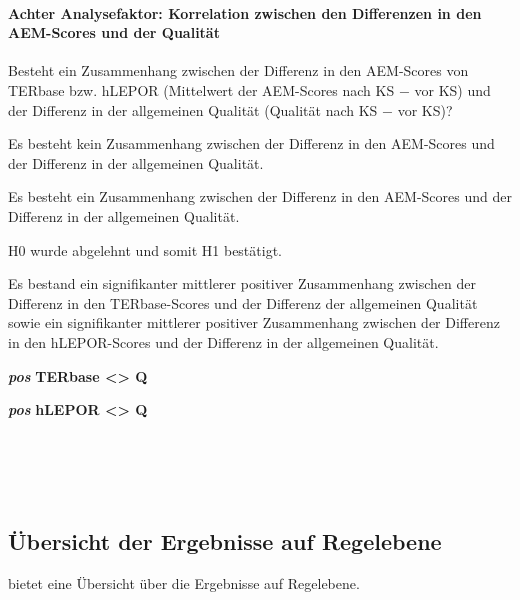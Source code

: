 \paragraph*{Achter Analysefaktor: Korrelation zwischen den Differenzen in den AEM-Scores und der Qualität}
\begin{description}[font=\normalfont\bfseries]
\item [Fragestellung:] Besteht ein Zusammenhang zwischen der Differenz in den AEM-Scores von TERbase bzw. hLEPOR (Mittelwert der AEM-Scores nach KS $-$ vor KS) und der Differenz in der allgemeinen Qualität (Qualität nach KS $-$ vor KS)?
\item [H0 --] Es besteht kein Zusammenhang zwischen der Differenz in den AEM-Scores und der Differenz in der allgemeinen Qualität.
\item [H1 --] Es besteht ein Zusammenhang zwischen der Differenz in den AEM-Scores und der Differenz in der allgemeinen Qualität.
\item [Resultat]
\end{description}
\noindent
\parbox[t]{.7\textwidth}{
H0 wurde abgelehnt und somit H1 bestätigt.

Es bestand ein signifikanter mittlerer positiver Zusammenhang zwischen der Differenz in den TERbase-Scores und der Differenz der allgemeinen Qualität sowie ein signifikanter mittlerer positiver Zusammenhang zwischen der Differenz in den hLEPOR-Scores und der Differenz in der allgemeinen Qualität.
}
\parbox[t]{.04\textwidth}{}
\colorbox{smGreen}{\parbox[t]{.25\textwidth}{
\textbf{\textit{pos}} \textbf{TERbase <> Q}

 \textbf{\textit{pos}} \textbf{hLEPOR <> Q}\\
 \\
 \\
 \\
 \\
}}


\subsection{Übersicht der Ergebnisse auf Regelebene}
\label{sec:5.3.10}

 bietet eine Übersicht über die Ergebnisse auf Regelebene.


